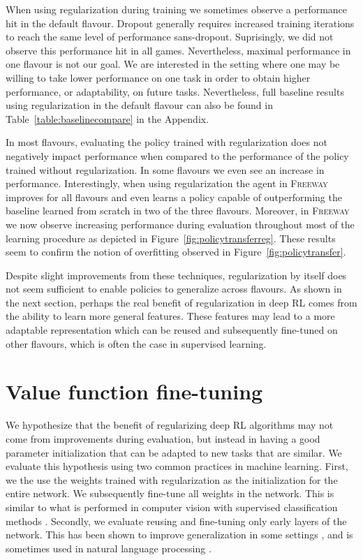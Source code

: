 \documentclass{article}
\begin{document}
When using regularization during training we sometimes observe a performance hit in the default flavour. Dropout generally requires increased training iterations to reach the same level of performance sans-dropout. Suprisingly, we did not observe this performance hit in all games. Nevertheless, maximal performance in one flavour is not our goal. We are interested in the setting where one may be willing to take lower performance on one task in order to obtain higher performance, or adaptability, on future tasks. Nevertheless, full baseline results using regularization in the default flavour can also be found in Table~\ref{table:baselinecompare} in the Appendix. 

In most flavours, evaluating the policy trained with regularization does not negatively impact performance when compared to the performance of the policy trained without regularization. In some flavours we even see an increase in performance. Interestingly, when using regularization the agent in \textsc{Freeway} improves for all flavours and even learns a policy capable of outperforming the baseline learned from scratch in two of the three flavours.
Moreover, in \textsc{Freeway} we now observe increasing performance during evaluation throughout most of the learning procedure as depicted in Figure~\ref{fig:policytransferreg}.
These results seem to confirm the notion of overfitting observed in Figure~\ref{fig:policytransfer}.

Despite slight improvements from these techniques, regularization by itself does not seem sufficient to enable policies to generalize across flavours. As shown in the next section, perhaps the real benefit of regularization in deep RL comes from the ability to learn more general features. These features may lead to a more adaptable representation which can be reused and subsequently fine-tuned on other flavours, which is often the case in supervised learning.



\section{Value function fine-tuning}

We hypothesize that the benefit of regularizing deep RL algorithms may not come from improvements during evaluation, but instead in having a good parameter initialization that can be adapted to new tasks that are similar.
We evaluate this hypothesis using two common practices in machine learning. First, we the use the weights trained with regularization as the initialization for the entire network. We subsequently fine-tune all weights in the network. This is similar to what is performed in computer vision with supervised classification methods \citep[e.g.,][]{Razavian14}. Secondly, we evaluate reusing and fine-tuning only early layers of the network. This has been shown to improve generalization in some settings \citep[e.g.,][]{Yosinski14}, and is sometimes used in natural language processing \citep[e.g.,][]{Mou16, Howard18}. 
\end{document}
